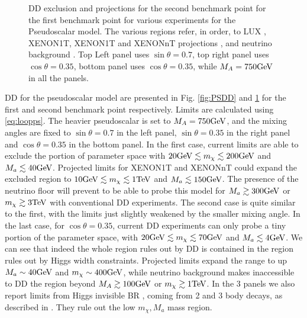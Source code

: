\begin{figure}[ht]
\begin{center}
\caption{DD exclusion and projections for the second benchmark point for the first benchmark point for various experiments for the Pseudoscalar model. The various regions refer, in order, to LUX \citep{Akerib:2016vxi}, XENON1T\citep{Aprile:2017iyp}, XENON1T and XENONnT projections \citep{Aprile:2015uzo}, and neutrino background \citep{Billard:2013qya}. Top Left panel uses $\sin\theta=0.7$, top right panel uses $\cos\theta=0.35$, bottom panel uses $\cos\theta=0.35$, while $M_A=750\textrm{GeV}$ in all the panels.} 
\label{fig:PSDD2}
\end{center}
\end{figure} 

DD for the pseudoscalar model are presented in Fig. \ref{fig:PSDD} and \ref{fig:PSDD2} for the first and second benchmark point respectively. Limits are calculated using \ref{eq:loopps}. The heavier pseudoscalar is set to $M_A=750\textrm{GeV}$, and the mixing angles are fixed to $\sin\theta=0.7$ in the left panel, $\sin\theta=0.35$ in the right panel and $\cos\theta=0.35$ in the bottom panel. In the first case, current limits are able to exclude the portion of parameter space with $20\textrm{GeV} \lesssim m_\chi \lesssim 200\textrm{GeV}$ and $M_a \lesssim 40\textrm{GeV}$. Projected limits for XENON1T and XENONnT could expand the excluded region to $10\textrm{GeV} \lesssim m_\chi \lesssim 1\textrm{TeV}$ and $M_a \lesssim 150\textrm{GeV}$. The presence of the neutrino floor will prevent to be able to probe this model for $M_a\gtrsim 300\textrm{GeV}$ or $m_\chi \gtrsim 3\textrm{TeV}$ with conventional DD experiments. The second case is quite similar to the first, with the limits just slightly weakened by the smaller mixing angle. In the last case, for $\cos\theta=0.35$, current DD experiments can only probe a tiny portion of the parameter space, with $20\textrm{GeV} \lesssim m_\chi \lesssim 70\textrm{GeV}$ and $M_a \lesssim 4\textrm{GeV}$. We can see that indeed the whole region rules out by DD is contained in the region rules out by Higgs width constraints. Projected limits expand the range to up $M_a\sim 40\textrm{GeV}$ and $m_\chi\sim 400\textrm{GeV}$, while neutrino background makes inaccessible to DD the region beyond $M_A\gtrsim 100\textrm{GeV}$ or $m_\chi \gtrsim 1\textrm{TeV}$. In the 3 panels we also report limits from Higgs invisible BR \citep{Aad:2015pla,Khachatryan:2016whc}, coming from 2 and 3 body decays, as described in \citep{Bauer:2017ota}. They rule out the low $m_\chi,M_a$ mass region.
